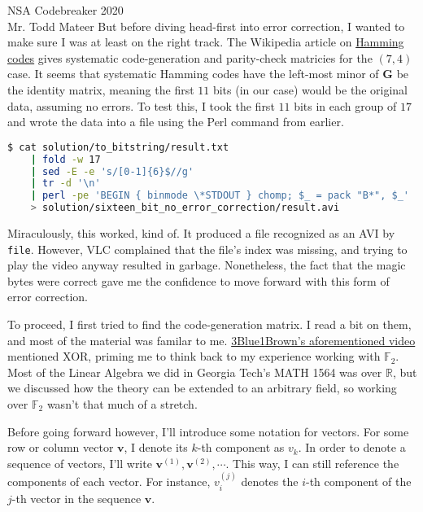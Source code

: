 \documentclass{letter}
\begin{document}
\begin{letter}{NSA Codebreaker 2020\\Mr. Todd Mateer}
But before diving head-first into error correction, I wanted to make sure I was
at least on the right track. The Wikipedia article on
\href{https://en.wikipedia.org/wiki/Hamming_code}{Hamming codes} gives
systematic code-generation and parity-check matricies for the \((7,4)\) case. It
seems that systematic Hamming codes have the left-most minor of \(\mathbf{G}\)
be the identity matrix, meaning the first \(11\) bits (in our case) would be
the original data, assuming no errors. To test this, I took the first \(11\)
bits in each group of \(17\) and wrote the data into a file using the Perl
command from earlier.
\begin{lstlisting}[language=Bash]
$ cat solution/to_bitstring/result.txt                                  \
    | fold -w 17                                                        \
    | sed -E -e 's/[0-1]{6}$//g'                                        \
    | tr -d '\n'                                                        \
    | perl -pe 'BEGIN { binmode \*STDOUT } chomp; $_ = pack "B*", $_'   \
    > solution/sixteen_bit_no_error_correction/result.avi
\end{lstlisting}


Miraculously, this worked, kind of. It produced a file recognized as an AVI by
\texttt{file}. However, VLC complained that the file's index was missing, and
trying to play the video anyway resulted in garbage. Nonetheless, the fact that
the magic bytes were correct gave me the confidence to move forward with this
form of error correction.


\newpage
To proceed, I first tried to find the code-generation matrix. I read a bit on
them, and most of the material was familar to me.
\href{https://youtu.be/X8jsijhllIA}{3Blue1Brown's aforementioned video}
mentioned XOR, priming me to think back to my experience working with
\(\mathbb{F}_2\). Most of the Linear Algebra we did in Georgia Tech's MATH 1564
was over \(\mathbb{R}\), but we discussed how the theory can be extended to an
arbitrary field, so working over \(\mathbb{F}_2\) wasn't that much of a stretch.


Before going forward however, I'll introduce some notation for vectors. For some
row or column vector \(\mathbf{v}\), I denote its \(k\)-th component as \(v_k\).
In order to denote a sequence of vectors, I'll write
\(\mathbf{v}^{(1)},\mathbf{v}^{(2)},\cdots\). This way, I can still reference
the components of each vector. For instance, \(v^{(j)}_i\) denotes the \(i\)-th
component of the \(j\)-th vector in the sequence \(\mathbf{v}\).



\end{letter}
\end{document}
